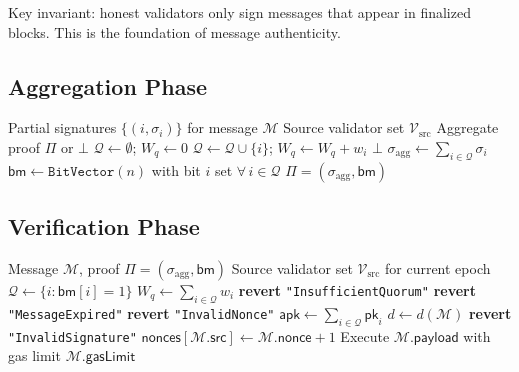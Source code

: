 \documentclass[11pt,a4paper]{article}
\begin{document}
Key invariant: honest validators only sign messages that appear in finalized blocks. This is the foundation of message authenticity.

\subsection{Aggregation Phase}

\begin{algorithm}[H]
\caption{Signature Aggregation (Relayer)}
\label{alg:aggregation}
\begin{algorithmic}[1]
\Require Partial signatures $\{(i, \sigma_i)\}$ for message $\mathcal{M}$
\Require Source validator set $\mathcal{V}_{\text{src}}$
\Ensure Aggregate proof $\Pi$ or $\bot$
\State $\mathcal{Q} \gets \emptyset$; $W_q \gets 0$
     
        \State $\mathcal{Q} \gets \mathcal{Q} \cup \{i\}$; $W_q \gets W_q + w_i$
    \EndIf
\EndFor
{}
    \State \Return $\bot$ 
\EndIf
\State $\sigma_{\text{agg}} \gets \sum_{i \in \mathcal{Q}} \sigma_i$ 
\State $\mathsf{bm} \gets \texttt{BitVector}(n)$ with bit $i$ set $\forall\, i \in \mathcal{Q}$
\State \Return $\Pi = (\sigma_{\text{agg}}, \mathsf{bm})$
\end{algorithmic}
\end{algorithm}

\subsection{Verification Phase}

\begin{algorithm}[H]
\caption{On-Chain Warp Verification (Destination Appchain)}
\label{alg:verification}
\begin{algorithmic}[1]
\Require Message $\mathcal{M}$, proof $\Pi = (\sigma_{\text{agg}}, \mathsf{bm})$
\Require Source validator set $\mathcal{V}_{\text{src}}$ for current epoch
\State $\mathcal{Q} \gets \{i : \mathsf{bm}[i] = 1\}$
\State $W_q \gets \sum_{i \in \mathcal{Q}} w_i$
    \State \textbf{revert} \texttt{"InsufficientQuorum"}
\EndIf
{}
    \State \textbf{revert} \texttt{"MessageExpired"}
\EndIf
{}
    \State \textbf{revert} \texttt{"InvalidNonce"}
\EndIf
\State $\mathsf{apk} \gets \sum_{i \in \mathcal{Q}} \mathsf{pk}_i$
\State $d \gets d(\mathcal{M})$
    \State \textbf{revert} \texttt{"InvalidSignature"}
\EndIf
\State $\mathsf{nonces}[\mathcal{M}.\mathsf{src}] \gets \mathcal{M}.\mathsf{nonce} + 1$
\State Execute $\mathcal{M}.\mathsf{payload}$ with gas limit $\mathcal{M}.\mathsf{gasLimit}$
\end{algorithmic}
\end{algorithm}
\end{document}
